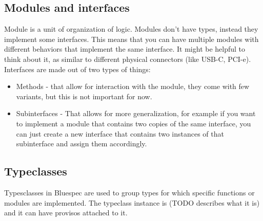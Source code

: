 \documentclass[12pt]{report}
\begin{document}
\subsection{Modules and interfaces}
Module is a unit of organization of logic. Modules don't have types, instead they implement some interfaces. This means that you can have multiple modules with different behaviors that implement the same interface. It might be helpful to think about it, as similar to different physical connectors (like USB-C, PCI-e). Interfaces are made out of two types of things:
\begin{itemize}
    \item Methods - that allow for interaction with the module, they come with few variants, but this is not important for now.
    \item Subinterfaces - That allows for more generalization, for example if you want to implement a module that contains two copies of the same interface, you can just create a new interface that contains two instances of that subinterface and assign them accordingly.
\end{itemize}

\subsection{Typeclasses}
\label{sec:Typeclasses}
Typesclasses in Bluespec are used to group types for which specific functions or modules are implemented. The typeclass instance is (TODO describes what it is) and it can have provisos attached to it.
\end{document}
